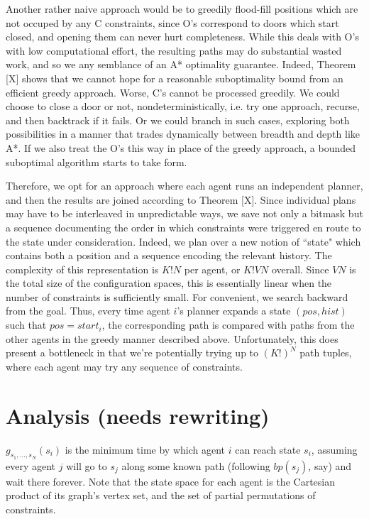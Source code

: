 \documentclass[letterpaper]{article}
\begin{document}
Another rather naive approach would be to greedily flood-fill positions which are not occuped by any C constraints, since O's correspond to doors which start closed, and opening them can never hurt completeness. While this deals with O's with low computational effort, the resulting paths may do substantial wasted work, and so we any semblance of an A* optimality guarantee. Indeed, Theorem [X] shows that we cannot hope for a reasonable suboptimality bound from an efficient greedy approach. Worse, C's cannot be processed greedily. We could choose to close a door or not, nondeterministically, i.e. try one approach, recurse, and then backtrack if it fails. Or we could branch in such cases, exploring both possibilities in a manner that trades dynamically between breadth and depth like A*. If we also treat the O's this way in place of the greedy approach, a bounded suboptimal algorithm starts to take form.

Therefore, we opt for an approach where each agent runs an independent planner, and then the results are joined according to Theorem [X]. Since individual plans may have to be interleaved in unpredictable ways, we save not only a bitmask but a sequence documenting the order in which constraints were triggered en route to the state under consideration. Indeed, we plan over a new notion of ``state" which contains both a position and a sequence encoding the relevant history. The complexity of this representation is $K!N$ per agent, or $K!VN$ overall. Since $VN$ is the total size of the configuration spaces, this is essentially linear when the number of constraints is sufficiently small. For convenient, we search backward from the goal. Thus, every time agent $i$'s planner expands a state $(pos, hist)$ such that $pos = start_i$, the corresponding path is compared with paths from the other agents in the greedy manner described above. Unfortunately, this does present a bottleneck in that we're potentially trying up to $(K!)^N$ path tuples, where each agent may try any sequence of constraints.

\section{Analysis (needs rewriting)}

$g_{s_1,\ldots,s_N}(s_i)$ is the minimum time by which agent $i$ can reach state $s_i$, assuming every agent $j$ will go to $s_j$ along some known path (following $bp(s_j)$, say) and wait there forever. Note that the state space for each agent is the Cartesian product of its graph's vertex set, and the set of partial permutations of constraints.
\end{document}
